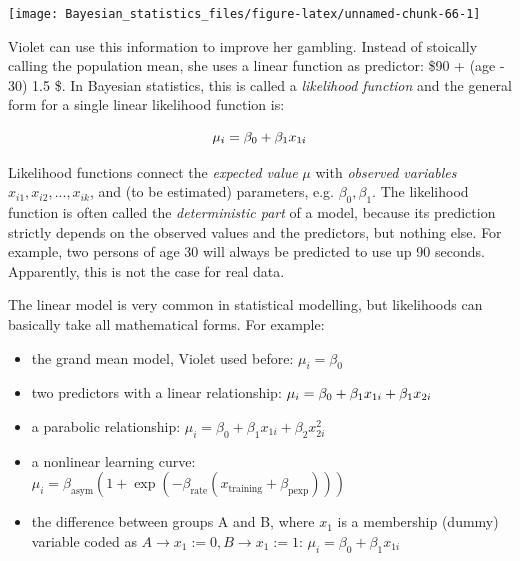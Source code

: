 \documentclass[]{svmono}
\newenvironment{Shaded}{\begin{snugshade}}{\end{snugshade}}
\newcommand{\KeywordTok}[1]{\textcolor[rgb]{0.13,0.29,0.53}{\textbf{#1}}}
\newcommand{\DataTypeTok}[1]{\textcolor[rgb]{0.13,0.29,0.53}{#1}}
\newcommand{\StringTok}[1]{\textcolor[rgb]{0.31,0.60,0.02}{#1}}
\newcommand{\OperatorTok}[1]{\textcolor[rgb]{0.81,0.36,0.00}{\textbf{#1}}}
\newcommand{\NormalTok}[1]{#1}
\providecommand{\tightlist}{%
  \setlength{\itemsep}{0pt}\setlength{\parskip}{0pt}}
\begin{document}
\begin{Shaded}
\end{Shaded}

\texttt{[image: Bayesian\_statistics\_files/figure-latex/unnamed-chunk-66-1]}

Violet can use this information to improve her gambling. Instead of
stoically calling the population mean, she uses a linear function as
predictor: \$90 + (\textrm{age} - 30) 1.5 \$. In Bayesian statistics,
this is called a \emph{likelihood function} and the general form for a
single linear likelihood function is:

\[\mu_i = \beta_0 + \beta_1x_{1i}\\\]

Likelihood functions connect the \emph{expected value} \(\mu\) with
\emph{observed variables} \(x_{i1}, x_{i2}, ..., x_{ik}\), and (to be
estimated) parameters, e.g. \(\beta_0, \beta_1\). The likelihood
function is often called the \emph{deterministic part} of a model,
because its prediction strictly depends on the observed values and the
predictors, but nothing else. For example, two persons of age 30 will
always be predicted to use up 90 seconds. Apparently, this is not the
case for real data.

The linear model is very common in statistical modelling, but
likelihoods can basically take all mathematical forms. For example:

\begin{itemize}
\tightlist
\item
  the grand mean model, Violet used before: \(\mu_i = \beta_0\)
\item
  two predictors with a linear relationship:
  \(\mu_i = \beta_0 + \beta_1x_{1i} + \beta_1x_{2i}\\\)
\item
  a parabolic relationship:
  \(\mu_i = \beta_0 + \beta_1x_{1i} + \beta_2x_{2i}^2\)
\item
  a nonlinear learning curve:
  \(\mu_i = \beta_\textrm{asym} (1 + \exp(-\beta_\textrm{rate}(x_\textrm{training} + \beta_\textrm{pexp})))\)
\item
  the difference between groups A and B, where \(x_1\) is a membership
  (dummy) variable coded as
  \(A\rightarrow x_1:=0, B\rightarrow x_1:=1\):
  \(\mu_i = \beta_0 + \beta_1x_{1i}\)
\end{itemize}
\end{document}

